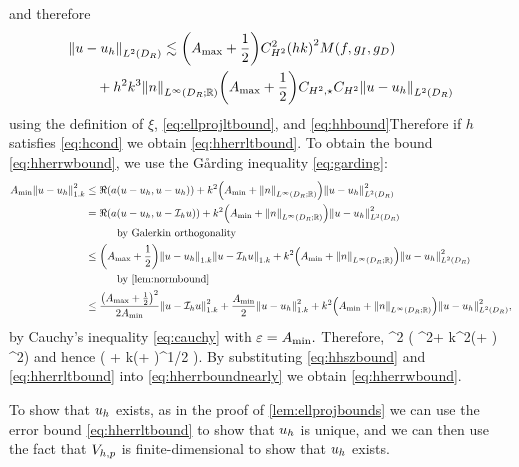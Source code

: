 and therefore
\begin{align*}
&  \NLtDR{u-\uh} \lesssim \mleft(\Amax + \half\mright)\CHthh^2 \mleft(hk\mright)^2 \rhs\\
&\quad\quad  + h^2k^3 \NLiDRRR{n} \mleft(\Amax + \half\mright) \CHtell \CHthh \NLtDR{u-\uh}
\end{align*}
  using the definition of $\xi$, \eqref{eq:ellprojltbound}, and \eqref{eq:hhbound}Therefore if $h$ satisfies \eqref{eq:hcond} we obtain \eqref{eq:hherrltbound}.
To obtain the bound \eqref{eq:hherrwbound}, we use the G\r{a}rding inequality \eqref{eq:garding}:
\begin{align*}
  \Amin \NW{u-\uh}^2 &\leq \Re\mleft(a\mleft(u-\uh,u-\uh\mright)\mright) + k^2\mleft(\Amin+ \NLiDRRR{n}\mright) \NLtDR{u-\uh}^2\\
                     &= \Re\mleft(a\mleft(u-\uh,u-\Ih u\mright)\mright) + k^2\mleft(\Amin+ \NLiDRRR{n}\mright) \NLtDR{u-\uh}^2\\
  &\quad\quad\quad\text{by Galerkin orthogonality}\\
                     &\leq \mleft(\Amax+\half\mright) \NW{u-\uh}\NW{u-\Ih u} + k^2\mleft(\Amin+ \NLiDRRR{n}\mright) \NLtDR{u-\uh}^2\\
  &\quad\quad\quad\text{by \cref{lem:normbound}}\\
  &\leq \frac{\mleft(\Amax+\half\mright)^2}{2\Amin} \NW{u-\Ih u}^2 + \frac{\Amin}2 \NW{u-\uh}^2 + k^2\mleft(\Amin+ \NLiDRRR{n}\mright) \NLtDR{u-\uh}^2,\\
\end{align*}
by Cauchy's inequality \eqref{eq:cauchy} with $\varepsilon = A_{\min}.$ Therefore,
\beqs
{}^2 \leq {} \mleft( ^2+ k^2\mleft(\Amin+ \mright) ^2\mright)
\eeqs
and hence
\beq\label{eq:hherrboundnearly}
 \lesssim {} \mleft( + k\mleft(\Amin+ \mright)^{1/2} \mright).
\eeq
By substituting \eqref{eq:hhszbound} and \eqref{eq:hherrltbound} into \eqref{eq:hherrboundnearly} we obtain \eqref{eq:hherrwbound}.

To show that $u_{h}$ exists, as in the proof of \cref{lem:ellprojbounds} we can use the error bound \eqref{eq:hherrltbound} to show that $u_{h}$ is unique, and we can then use the fact that $V_{h,p}$ is finite-dimensional to show that $u_{h}$ exists.
\epf



